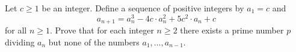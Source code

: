 Let $c \geq 1$ be an integer. Define a sequence of positive integers by $a_1 = c$ and
\[ a_{n+1} = a_n^3 - 4c \cdot a_n^2 + 5c^2 \cdot a_n + c \]
for all $n \geq 1$. Prove that for each integer $n \geq 2$ there exists a prime number $p$ dividing $a_n$ but none of the numbers $a_1, \ldots, a_{n-1}$.
